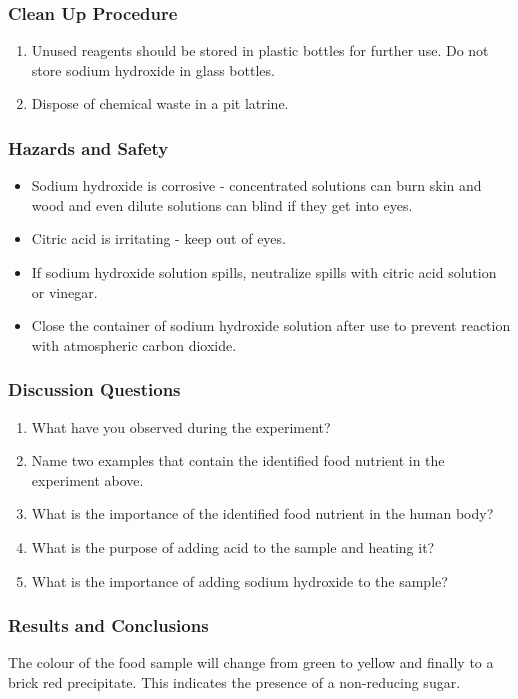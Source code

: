 \subsubsection*{Clean Up Procedure}
\begin{enumerate}
\item{Unused reagents should be stored in plastic bottles for further use. Do not store sodium hydroxide in glass bottles.}
\item{Dispose of chemical waste in a pit latrine.}
\end{enumerate}

\subsubsection*{Hazards and Safety}
\begin{itemize}
\item{Sodium hydroxide is corrosive - concentrated solutions can burn skin and wood and even dilute solutions can blind if they get into eyes.}
\item{Citric acid is irritating - keep out of eyes.}
\item{If sodium hydroxide solution spills, neutralize spills with citric acid solution or vinegar.}
\item{Close the container of sodium hydroxide solution after use to prevent reaction with atmospheric carbon dioxide.}
\end{itemize}

\subsubsection*{Discussion Questions}
\begin{enumerate}
\item{What have you observed during the experiment?}
\item{Name two examples that contain the identified food nutrient in the experiment above.}
\item{What is the importance of the identified food nutrient in the human body?}
\item{What is the purpose of adding acid to the sample and heating it?}
\item{What is the importance of adding sodium hydroxide to the sample?}
\end{enumerate}

\subsubsection*{Results and Conclusions}
The colour of the food sample will change from green to yellow and finally to a brick red precipitate. This indicates the presence of a non-reducing sugar.

